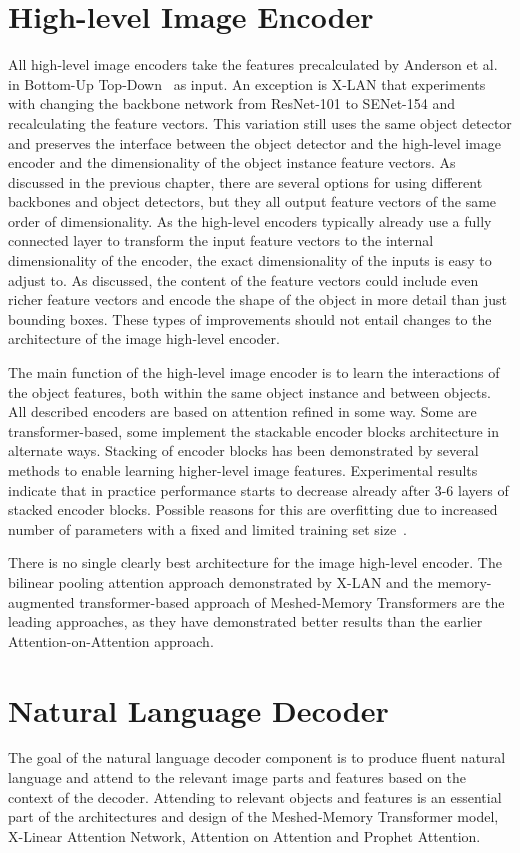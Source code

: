 \documentclass[english,twoside,openright]{HYgraduMLDS}
\begin{document}
\section{High-level Image Encoder}
All high-level image encoders take the features precalculated by Anderson et al. in Bottom-Up Top-Down~\cite{BottomUp} as input. An exception is X-LAN that experiments with changing the backbone network from ResNet-101 to SENet-154 and recalculating the feature vectors. This variation still uses the same object detector and preserves the interface between the object detector and the high-level image encoder and the dimensionality of the object instance feature vectors. As discussed in the previous chapter, there are several options for using different backbones and object detectors, but they all output feature vectors of the same order of dimensionality. As the high-level encoders typically already use a fully connected layer to transform the input feature vectors to the internal dimensionality of the encoder, the exact dimensionality of the inputs is easy to adjust to. As discussed, the content of the feature vectors could include even richer feature vectors and encode the shape of the object in more detail than just bounding boxes. These types of improvements should not entail changes to the architecture of the image high-level encoder.

The main function of the high-level image encoder is to learn the interactions of the object features, both within the same object instance and between objects. All described encoders are based on attention refined in some way. Some are transformer-based, some implement the stackable encoder blocks architecture in alternate ways. Stacking of encoder blocks has been demonstrated by several methods to enable learning higher-level image features. Experimental results~\cite{M2, XLinearAN} indicate that in practice performance starts to decrease already after 3-6 layers of stacked encoder blocks. Possible reasons for this are overfitting due to increased number of parameters with a fixed and limited training set size~\cite{XLinearAN}.

There is no single clearly best architecture for the image high-level encoder. The bilinear pooling attention approach demonstrated by X-LAN and the memory-augmented transformer-based approach of Meshed-Memory Transformers are the leading approaches, as they have demonstrated better results than the earlier Attention-on-Attention approach.

\section{Natural Language Decoder}
The goal of the natural language decoder component is to produce fluent natural language and attend to the relevant image parts and features based on the context of the decoder. Attending to relevant objects and features is an essential part of the architectures and design of the Meshed-Memory Transformer model, X-Linear Attention Network, Attention on Attention and Prophet Attention.
\end{document}
